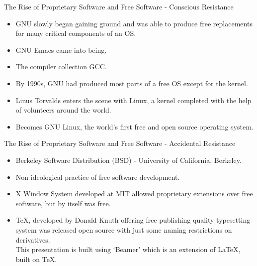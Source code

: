 \documentclass{beamer}
\begin{document}
\begin{frame}{The Rise of Proprietary Software and Free Software - Conscious Resistance}
\begin{itemize}
	\item GNU slowly began gaining ground and was able to produce free replacements for many critical components of an OS. \pause
	\item GNU Emacs came into being. \pause
	\item The compiler collection GCC. \pause
	\item By 1990s, GNU had produced most parts of a free OS except for the kernel. \pause
	\item Linus Torvalds enters the scene with Linux, a kernel completed with the help of volunteers around the world. \pause
	\item Becomes GNU Linux, the world's first free and open source operating system.
\end{itemize}
\end{frame}

\begin{frame}{The Rise of Proprietary Software and Free Software - Accidental Resistance}
\begin{itemize}
	\item Berkeley Software Distribution (BSD) - University of California, Berkeley. \pause
	\item Non ideological practice of free software development. \pause
	\item X Window System developed at MIT allowed proprietary extensions over free software, but by itself was free. \pause
	\item \TeX , developed by Donald Knuth offering free publishing quality typesetting system was released open source with just some naming restrictions on derivatives. \pause
	\vspace{0.4cm} \\This presentation is built using `Beamer' which is an extension of \LaTeX , built on \TeX.
\end{itemize}
\end{frame}
\end{document}
